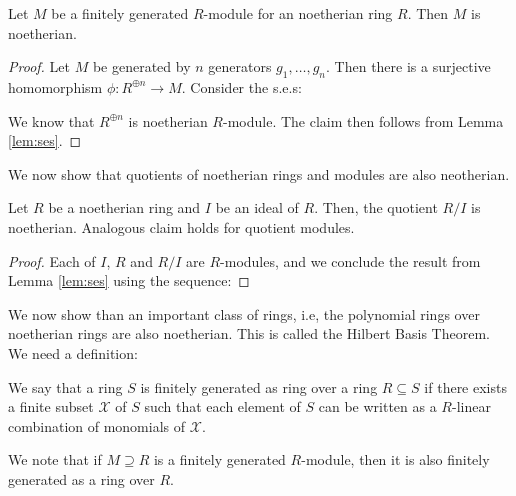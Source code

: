 \documentclass[11pt]{article}
\begin{document}
\begin{lemma}\label{lem:modules-noetherian-ring}
Let $M$ be a finitely generated $R$-module for an noetherian ring $R$. Then $M$ is noetherian.
\end{lemma}
\begin{proof}
Let $M$ be generated by $n$ generators $g_1,\ldots, g_n$. Then there is a surjective homomorphism
$\phi: R^{\oplus n}\rightarrow M$. Consider the s.e.s:


We know that $R^{\oplus n}$ is noetherian $R$-module.
The claim then follows from Lemma \ref{lem:ses}.
\end{proof}

We now show that quotients of noetherian rings and modules are also neotherian.

\begin{lemma}\label{lem:noetherian-quotients}
Let $R$ be a noetherian ring and $I$ be an ideal of $R$.
Then, the quotient $R/I$ is noetherian. Analogous
claim holds for quotient modules.
\end{lemma}
\begin{proof}
Each of $I$, $R$ and $R/I$ are $R$-modules, and we conclude the result from Lemma \ref{lem:ses} using the
sequence:
\end{proof}

We now show than an important class of rings, i.e, the polynomial rings over noetherian rings are also
noetherian. This is called the Hilbert Basis Theorem. We need a definition:
\begin{definition}\label{defn:rings-over-rings}
We say that a ring $S$ is finitely generated as ring over a ring $R\subseteq S$ if there exists a finite subset
$\mathcal{X}$ of $S$ such that each element of $S$ can be written as a $R$-linear combination of
monomials of $\mathcal{X}$.
\end{definition}
We note that if $M\supseteq R$ is a finitely generated $R$-module, then it is also finitely generated as a ring
over $R$.
\end{document}

